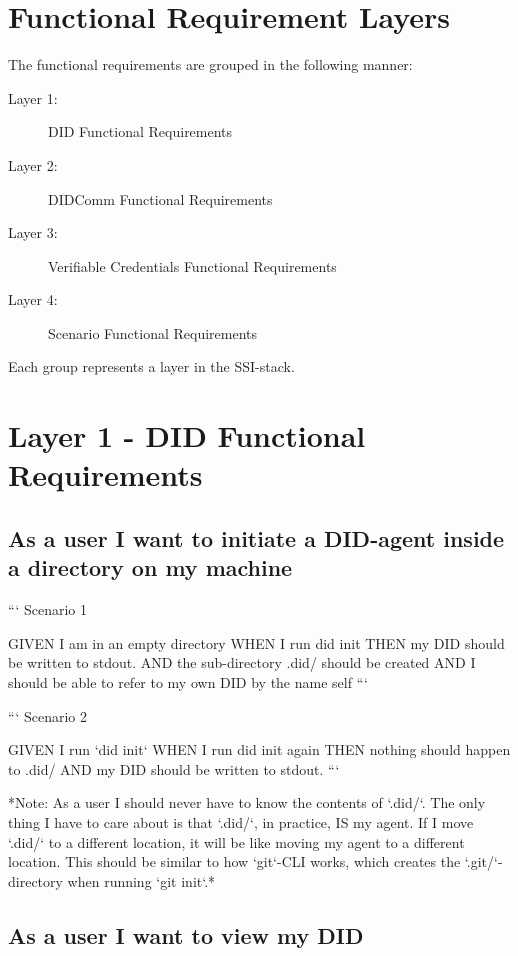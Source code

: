 \section{Functional Requirement Layers}

The functional requirements are grouped in the following manner:
\begin{description}
\item[Layer 1:] DID Functional Requirements
\item[Layer 2:] DIDComm Functional Requirements
\item[Layer 3:] Verifiable Credentials Functional Requirements
\item[Layer 4:] Scenario Functional Requirements
\end{description}

Each group represents a layer in the SSI-stack.

\section{Layer 1 - DID Functional Requirements}

\subsection{As a user I want to initiate a DID-agent inside a directory on my machine}

```
Scenario 1

GIVEN I am in an empty directory
WHEN  I run did init
THEN  my DID should be written to stdout.
AND   the sub-directory .did/ should be created
AND   I should be able to refer to my own DID by the name self
```

```
Scenario 2

GIVEN I run `did init`
WHEN  I run did init again
THEN  nothing should happen to .did/
AND   my DID should be written to stdout.
```

*Note: As a user I should never have to know the contents of `.did/`. The only thing I have to care about is that `.did/`, in practice, IS my agent. If I move `.did/` to a different location, it will be like moving my agent to a different location. This should be similar to how `git`-CLI works, which creates the `.git/`-directory when running `git init`.*

\subsection{As a user I want to view my DID}

